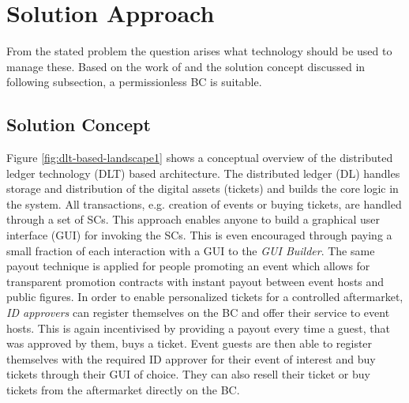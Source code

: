 \section{Solution Approach}


From the stated problem the question arises what technology should be used to manage these. Based on the work of \citet{wust2018you} and the solution concept discussed in following subsection, a permissionless BC is suitable.

\subsection{Solution Concept}\label{chapter:introduction:concept}
Figure \ref{fig:dlt-based-landscape1} shows a conceptual overview of the distributed ledger technology (DLT) based architecture. The distributed ledger (DL) handles storage and distribution of the digital assets (tickets) and builds the core logic in the system. All transactions, e.g. creation of events or buying tickets, are handled through a set of SCs. This approach enables anyone to build a graphical user interface (GUI) for invoking the SCs. This is even encouraged through paying a small fraction of each interaction with a GUI to the \textit{GUI Builder}. The same payout technique is applied for people promoting an event which allows for transparent promotion contracts with instant payout between event hosts and public figures. In order to enable personalized tickets for a controlled aftermarket, \textit{ID approvers} can register themselves on the BC and offer their service to event hosts. This is again incentivised by providing a payout every time a guest, that was approved by them, buys a ticket. Event guests are then able to register themselves with the required ID approver for their event of interest and buy tickets through their GUI of choice. They can also resell their ticket or buy tickets from the aftermarket directly on the BC.
